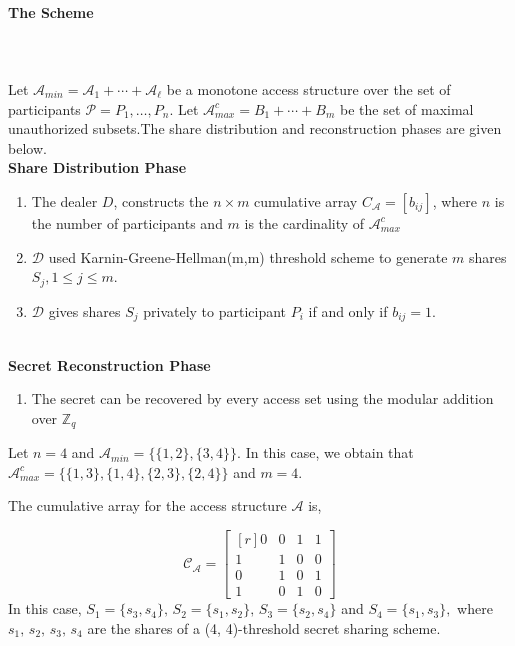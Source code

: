 \documentclass{llncs}
\begin{document}
      \paragraph{\textbf{The Scheme}} \ \\ \\
      Let $\mathcal{A}_{min}=\mathcal{A}_1+\cdots+\mathcal{A}_\ell$ be a monotone access structure over the set of participants $\mathcal{P}={P_1,\ldots,P_n}$. Let $\mathcal{A}_{max}^c=B_1+\cdots+B_m$ be the set of maximal unauthorized subsets.The share distribution and reconstruction phases are given below.\\  
\textbf{Share Distribution Phase}
 \begin{enumerate}
    \item The dealer $D$, constructs the $n \times m$ cumulative array $C_{\mathcal{A}}=[b_{ij}]$,   where $n$ is the number of participants and $m$ is the cardinality of $\mathcal{A}_{max}^c$
      \item $\mathcal{D}$ used Karnin-Greene-Hellman(m,m) threshold scheme \cite{karnin1983} to generate $m$ shares $S_j,1 \le j \le m$.
      \item $\mathcal{D}$ gives shares $S_j$ privately to participant $P_i$ if and only if $b_{ij}=1$.
\end{enumerate} \ \\ 
\textbf{Secret Reconstruction Phase}
\begin{enumerate}
     \item The secret can be recovered by every access set using the modular addition over $\mathbb{Z}_q$
\end{enumerate}
      
      \begin{example}
      Let $n = 4$ and $\mathcal{A}_{min} = \{\{1,2\}, \{3,4\}\}.$ In this case, we obtain that $\mathcal{{A}}_{max}^c = \{\{1,3\}, \{1,4\}, \{2,3\},\{2,4\}\}$ and \mbox{$m = 4.$}
      
      The cumulative array for the access structure $\mathcal{A}$ is,
      

      $$\mathcal{C}_\mathcal{A}=\begin{bmatrix*}[r]           
      		 0 & 0 & 1 & 1 \\
             1 & 1 & 0 & 0 \\
             0 & 1 & 0 & 1 \\
             1 & 0 & 1 & 0
      \end{bmatrix*}$$
      In this case, $S_1 = \{s_3, s_4\},\, S_2 = \{s_1, s_2\},\, S_3 = \{s_2, s_4\}$
      and $S_4 = \{s_1, s_3\},$ where $s_1, \, s_2,\, s_3,\, s_4$ are the shares of a (4, 4)-threshold secret sharing scheme.
      \end{example}
      
\end{document}

